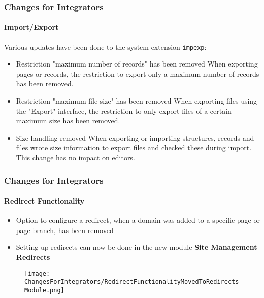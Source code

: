 \begin{frame}[fragile]
	\frametitle{Changes for Integrators}
	\framesubtitle{Import/Export}

	Various updates have been done to the system extension \texttt{impexp}:

	\begin{itemize}
		\item Restriction "maximum number of records" has been removed\newline
			\smaller
				When exporting pages or records, the restriction to export
				only a maximum number of records has been removed.
			\normalsize

		\item Restriction "maximum file size" has been removed\newline
			\smaller
				When exporting files using the "Export" interface, the
				restriction to only export files of a certain maximum size
				has been removed.
			\normalsize

		\item Size handling removed\newline
			\smaller
				When exporting or importing structures, records and files wrote
				size information to export files and checked these during import.
				This change has no impact on editors.
			\normalsize

	\end{itemize}

\end{frame}


\begin{frame}[fragile]
	\frametitle{Changes for Integrators}
	\framesubtitle{Redirect Functionality}

	\begin{itemize}
		\item Option to configure a redirect, when a domain was added to a specific
			page or page branch, has been removed
		\item Setting up redirects can now be done in the new module\newline
			\textbf{Site Management} \textrightarrow \textbf{Redirects}
	\end{itemize}

	\begin{figure}
		\texttt{[image: ChangesForIntegrators/RedirectFunctionalityMovedToRedirectsModule.png]}
	\end{figure}

\end{frame}

